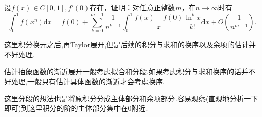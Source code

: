 \documentclass[../../main.tex]{subfiles}%
\begin{document}
\begin{example}
设\(f(x)\in C[0,1],f'(0)\)存在，证明：对任意正整数\(m\)，在\(n\rightarrow\infty\)时有
\[
\int_{0}^{1}f(x^{n})\mathrm{d}x = f(0)+\sum_{k = 0}^{m - 1}\frac{1}{n^{k + 1}}\int_{0}^{1}\frac{f(x)-f(0)}{x}\frac{\ln^{k}x}{k!}\mathrm{d}x + O\left(\frac{1}{n^{m+1}}\right).
\]
\end{example}
\begin{remark}
这里积分换元之后,再Taylor展开,但是后续的积分与求和的换序以及余项的估计并不好处理.
\end{remark}
\begin{note}
估计抽象函数的渐近展开一般考虑拟合和分段.如果考虑积分与求和换序的话并不好处理,一般只有估计具体函数的渐近才会考虑换序.

这里分段的想法也是将原积分分成主体部分和余项部分.容易观察(直观地分析一下即可)到这里积分的阶的主体部分集中在0附近.
\end{note}
\end{document}
